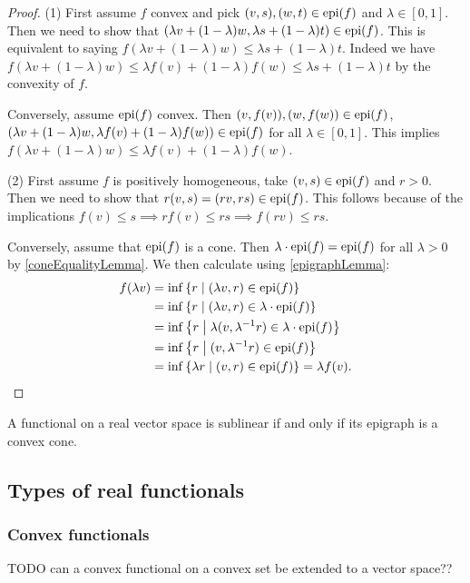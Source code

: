 \begin{proof}
(1) First assume $f$ convex and pick $(v, s), (w,t)\in \operatorname{epi}(f)$ and $\lambda\in [0,1]$. Then we need to show that $(\lambda v + (1-\lambda)w, \lambda s + (1-\lambda)t) \in \operatorname{epi}(f)$. This is equivalent to saying $f(\lambda v + (1-\lambda)w) \leq \lambda s + (1-\lambda)t$. Indeed we have $f(\lambda v + (1-\lambda)w) \leq \lambda f(v) + (1-\lambda)f(w) \leq \lambda s + (1-\lambda)t$ by the convexity of $f$.

Conversely, assume $\operatorname{epi}(f)$ convex. Then $(v, f(v)), (w,f(w))\in \operatorname{epi}(f)$, $(\lambda v + (1-\lambda)w, \lambda f(v) + (1-\lambda)f(w)) \in \operatorname{epi}(f)$ for all $\lambda\in [0,1]$. This implies $f(\lambda v + (1-\lambda)w) \leq \lambda f(v) + (1-\lambda)f(w)$.

(2) First assume $f$ is positively homogeneous, take $(v,s)\in \operatorname{epi}(f)$ and $r>0$. Then we need to show that $r(v,s) = (rv,rs)\in \operatorname{epi}(f)$. This follows because of the implications $f(v)\leq s \implies rf(v) \leq rs \implies f(rv) \leq rs$.

Conversely, assume that $\operatorname{epi}(f)$ is a cone. Then $\lambda\cdot \operatorname{epi}(f) = \operatorname{epi}(f)$ for all $\lambda>0$ by \ref{coneEqualityLemma}. We then calculate using \ref{epigraphLemma}:
\begin{align*}
f(\lambda v) &= \inf\setbuilder{r}{(\lambda v,r)\in \epigraph(f)} \\
&= \inf\setbuilder{r}{(\lambda v,r)\in \lambda\cdot\epigraph(f)} \\
&= \inf\setbuilder{r}{\lambda(v,\lambda^{-1}r)\in \lambda\cdot\epigraph(f)} \\
&= \inf\setbuilder{r}{(v,\lambda^{-1}r)\in \epigraph(f)} \\
&= \inf\setbuilder{\lambda r}{(v,r)\in \epigraph(f)} = \lambda f(v).
\end{align*} 
\end{proof}
\begin{corollary}
A functional on a real vector space is sublinear \textup{if and only if} its epigraph is a convex cone.
\end{corollary}

\subsection{Types of real functionals}
\subsubsection{Convex functionals}
TODO can a convex functional on a convex set be extended to a vector space??

